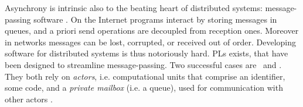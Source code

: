 Asynchrony is intrinsic also to
the beating heart of distributed systems: message-passing software
\cite{10.5555/2517679}.
On the Internet programs interact by storing messages in queues,
and a priori send operations are decoupled from reception ones.
Moreover in networks messages can be lost, corrupted, or received
out of order.
Developing software for distributed systems is thus notoriously
hard. PLs exists, that have been designed to streamline message-passing.
Two successful cases are \erlang\ and \elixir. They both rely on {\em
  actors}, i.e. computational units that
comprise an identifier, some code, and a {\em private mailbox} (i.e. a queue),
used for communication with other actors \cite{DBLP:journals/jfp/AghaMST97}.







